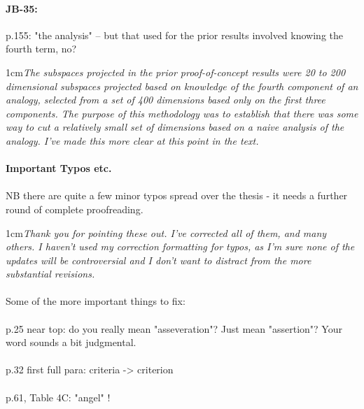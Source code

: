 \documentclass[11pt,a4paper]{article}
\newcommand{\res}[1]{\vspace{0.25cm} \begin{adjustwidth}{1cm}{}\emph{#1}\end{adjustwidth}}
\begin{document}
\paragraph{JB-35:} p.155: "the analysis" -- but that used for the prior results involved knowing the fourth term, no?

\res{The subspaces projected in the prior proof-of-concept results were 20 to 200 dimensional subspaces projected based on knowledge of the fourth component of an analogy, selected from a set of 400 dimensions based only on the first three components.  The purpose of this methodology was to establish that there was some way to cut a relatively small set of dimensions based on a naive analysis of the analogy.  I've made this more clear at this point in the text.}

\paragraph{Important Typos etc.}

\paragraph{}NB there are quite a few minor typos spread over the thesis - it needs a further round of complete proofreading.

\res{Thank you for pointing these out.  I've corrected all of them, and many others.  I haven't used my correction formatting for typos, as I'm sure none of the updates will be controversial and I don't want to distract from the more substantial revisions.}

\paragraph{} Some of the more important things to fix:

\paragraph{} p.25 near top: do you really mean "asseveration"? Just mean "assertion"? Your word sounds a bit judgmental.

\paragraph{} p.32 first full para:  criteria -> criterion

\paragraph{} p.61, Table 4C: "angel" !
\end{document}
